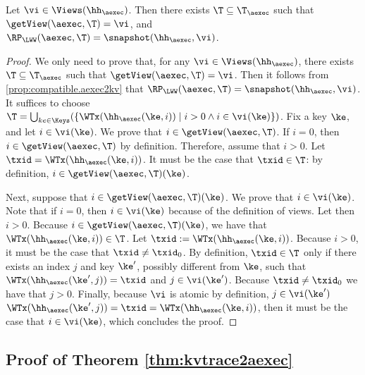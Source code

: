\begin{proposition}
\label{prop:compatible.kv2aexec}
Let $\vi \in \Views(\hh_{\aexec})$. Then there exists $\T \subseteq \T_{\aexec}$ 
such that $\getView(\aexec, \T) = \vi$, and $\RP_{\LWW}(\aexec, \T) = \snapshot(\hh_{\aexec}, \vi)$.
\end{proposition}

\begin{proof}
We only need to prove that, for any $\vi \in \Views(\hh_{\aexec})$, there exists $\T \subseteq \T_{\aexec}$ such 
that $\getView(\aexec, \T) = \vi$. Then it follows from \cref{prop:compatible.aexec2kv} that 
$\RP_{\LWW}(\aexec, \T) = \snapshot(\hh_{\aexec}, \vi)$. It suffices to choose $\T = \bigcup_{ke \in \Keys}(\{ \WTx(\hh_{\aexec}(\ke, i)) \mid i > 0 
\wedge i \in \vi(\ke)\})$.
Fix a key $\ke$, and let $i \in \vi(\ke)$. We prove that $i \in \getView(\aexec, \T)$. 
If $i = 0$, then $i \in \getView(\aexec, \T)$ by definition. 
Therefore, assume that $i > 0$. Let $\txid = \WTx(\hh_{\aexec}(\ke, i))$. It must be the case that $\txid \in \T$: by 
definition, $i \in \getView(\aexec, \T)(\ke)$.

Next, suppose that $i \in \getView(\aexec, \T)(\ke)$. We prove that $i \in \vi(\ke)$.
Note that if $i = 0$, then $i \in \vi(\ke)$ because of the 
definition of views. Let then $i > 0$. Because $i \in \getView(\aexec, \T)(\ke)$, we have that 
$\WTx(\hh_{\aexec}(\ke, i)) \in \T$.  Let $\txid := \WTx(\hh_{\aexec}(\ke, i))$. Because $i > 0$, 
it must be the case that $\txid \neq \txid_0$.
By definition, $\txid \in \T$ only if there 
exists an index $j$ and key $\ke'$, possibly different from $\ke$, such that $\WTx(\hh_{\aexec}(\ke', j)) = \txid$ and $j \in \vi(\ke')$. 
Because $\txid \neq \txid_0$ we have that $j > 0$. Finally, because $\vi$ is atomic by definition, $j \in \vi(\ke')$
$\WTx(\hh_{\aexec}(\ke', j)) = \txid = \WTx(\hh_{\aexec}(\ke, i))$, then it must be the case 
that $i \in \vi(\ke)$, which concludes the proof.
\end{proof}

\subsection{Proof of Theorem \ref{thm:kvtrace2aexec}}

